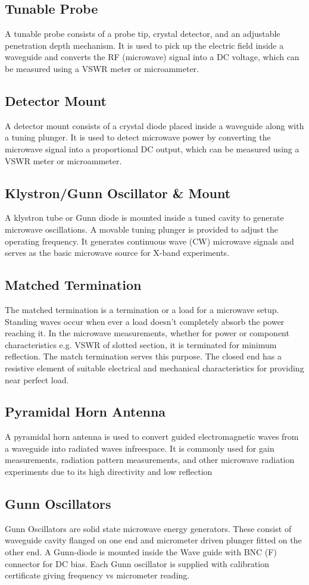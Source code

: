 \documentclass[11pt, a4paper]{article}
\begin{document}
\subsection{Tunable Probe}
A tunable probe consists of a probe tip, crystal detector, and an adjustable penetration depth mechanism.
It is used to pick up the electric field inside a waveguide and converts the RF (microwave) signal into a DC
voltage, which can be measured using a VSWR meter or microammeter.
\subsection{Detector Mount}
A detector mount consists of a crystal diode placed inside a waveguide along with a tuning plunger.
It is used to detect microwave power by converting the microwave signal into a proportional DC output, which
can be measured using a VSWR meter or microammeter.
\subsection{Klystron/Gunn Oscillator \& Mount}
A klystron tube or Gunn diode is mounted inside a tuned cavity to generate microwave oscillations.
A movable tuning plunger is provided to adjust the operating frequency.
It generates continuous wave (CW) microwave signals and serves as the basic microwave source for X-band
experiments.
\subsection{Matched Termination}
The matched termination is a termination or a load for a microwave setup. Standing waves occur when ever a
load doesn't completely absorb the power reaching it. In the microwave measurements, whether for power or
component characteristics e.g. VSWR of slotted section, it is terminated for minimum reflection. The match
termination serves this purpose. The closed end has a resistive element of suitable electrical and mechanical
characteristics for providing near perfect load.
\subsection{Pyramidal Horn Antenna}
A pyramidal horn antenna is used to convert guided electromagnetic waves from a waveguide into radiated waves
infreespace. It is commonly used for gain measurements, radiation pattern measurements, and other microwave
radiation experiments due to its high directivity and low reflection
\subsection{Gunn Oscillators}
Gunn Oscillators are solid state microwave energy generators. These consist of waveguide cavity flanged on one
end and micrometer driven plunger fitted on the other end. A Gunn-diode is mounted inside the Wave guide with
BNC (F) connector for DC bias. Each Gunn oscillator is supplied with calibration certificate giving frequency vs
micrometer reading.
\end{document}
